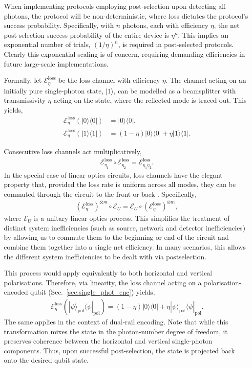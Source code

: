 \documentclass[aps,rmp,twocolumn,amsmath,amssymb,nofootinbib,superscriptaddress,longbibliography,floatfix]{revtex4-1}
\newcommand{\bra}[1]{\langle#1|}
\newcommand{\ket}[1]{|#1\rangle}
\begin{document}
When implementing protocols employing post-selection upon detecting all photons, the protocol will be non-deterministic, where loss dictates the protocol's success probability. Specifically, with $n$ photons, each with efficiency $\eta$, the net post-selection success probability of the entire device is $\eta^n$. This implies an exponential number of trials, \mbox{$(1/\eta)^n$}, is required in post-selected protocols. Clearly this exponential scaling is of concern, requiring demanding efficiencies in future large-scale implementations.

Formally, let $\mathcal{E}^\mathrm{loss}_\eta$ be the loss channel with efficiency $\eta$. The channel acting on an initially pure single-photon state, $\ket{1}$, can be modelled as a beamsplitter with transmissivity $\eta$ acting on the state, where the reflected mode is traced out. This yields,
\begin{align}
\mathcal{E}^\mathrm{loss}_\eta(\ket{0}\bra{0}) &= \ket{0}\bra{0}, \nonumber \\
\mathcal{E}^\mathrm{loss}_\eta(\ket{1}\bra{1}) &= (1-\eta)\ket{0}\bra{0} + \eta\ket{1}\bra{1}.
\end{align}

Consecutive loss channels act multiplicatively,
\begin{align}
\mathcal{E}_{\eta_1}^\mathrm{loss} \circ \mathcal{E}_{\eta_2}^\mathrm{loss} = \mathcal{E}_{\eta_1 \eta_2}^\mathrm{loss}.
\end{align}
In the special case of linear optics circuits, loss channels have the elegant property that, provided the loss rate is uniform across all modes, they can be commuted through the circuit to the front or back \cite{???}. Specifically,
\begin{align}
(\mathcal{E}_{\eta}^\mathrm{loss})^{\otimes m} \circ \mathcal{E}_U = \mathcal{E}_U \circ (\mathcal{E}_{\eta}^\mathrm{loss})^{\otimes m},
\end{align}
where $\mathcal{E}_U$ is a unitary linear optics process. This simplifies the treatment of distinct system inefficiencies (such as source, network and detector inefficiencies) by allowing us to commute them to the beginning or end of the circuit and combine them together into a single net efficiency. In many scenarios, this allows the different system inefficiencies to be dealt with via postselection.

This process would apply equivalently to both horizontal and vertical polarisations. Therefore, via linearity, the loss channel acting on a polarisation-encoded qubit (Sec.~\ref{sec:single_phot_enc}) yields,
\begin{align}
\mathcal{E}^\mathrm{loss}_\eta(\ket\psi_\mathrm{pol}\bra\psi_\mathrm{pol}) = (1-\eta) \ket{0}\bra{0} + \eta\ket\psi_\mathrm{pol}\bra\psi_\mathrm{pol}.
\end{align}
The same applies in the context of dual-rail encoding. Note that while this transformation mixes the state in the photon-number degree of freedom, it preserves coherence between the horizontal and vertical single-photon components. Thus, upon successful post-selection, the state is projected back onto the desired qubit state.
\end{document}
